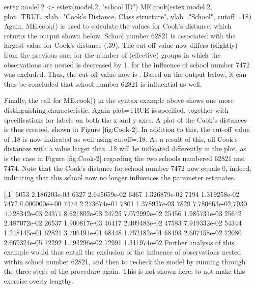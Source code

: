 estex.model.2 <- estex(model.2, "school.ID")
ME.cook(estex.model.2, plot=TRUE, 
    xlab="Cook's Distance, Class structure",
    ylab="School", 
    cutoff=.18)
Again, ME.cook() is used to calculate the values for Cook's distance, which returns the output shown below. School number 62821 is associated with the largest value for Cook's distance (.39). The cut-off value now differs (slightly) from the previous one, for the number of (effective) groups in which the observations are nested is decreased by 1, for the influence of school number 7472 was excluded. Thus, the cut-off value now is . Based on the output below, it can thus be concluded that school number 62821 is influential as well.

Finally, the call for ME.cook() in the syntax example above shows one more distinguishing characteristic. Again plot=TRUE is specified, together with specifications for labels on both the x and y axes. A plot of the Cook's distances is thus created, shown in Figure [fig:Cook-2]. In addition to this, the cut-off value of .18 is now indicated as well using cutoff=.18. As a result of this, all Cook's distances with a value larger than .18 will be indicated differently in the plot, as is the case in Figure [fig:Cook-2] regarding the two schools numbered 62821 and 7474. Note that the Cook's distance for school number 7472 now equals 0, indeed, indicating that this school now no longer influences the parameter estimates.

              [,1]
6053  2.186203e-03
6327  2.645659e-02
6467  1.326879e-02
7194  1.319258e-02
7472  0.000000e+00
7474  2.273674e-01
7801  1.378937e-03
7829  7.780663e-02
7930  4.728342e-03
24371 8.621802e-03
24725 7.072999e-02
25456 1.985731e-03
25642 2.487072e-02
26537 1.900817e-03
46417 2.409483e-02
47583 7.919332e-02
54344 1.248145e-01
62821 3.706191e-01
68448 1.752182e-01
68493 2.607158e-02
72080 2.669324e-05
72292 1.193296e-02
72991 1.311974e-02
Further analysis of this example would thus entail the exclusion of the influence of observations nested within school number 62821, and then to recheck the model by running through the three steps of the procedure again. This is not shown here, to not make this exercise overly lengthy.
